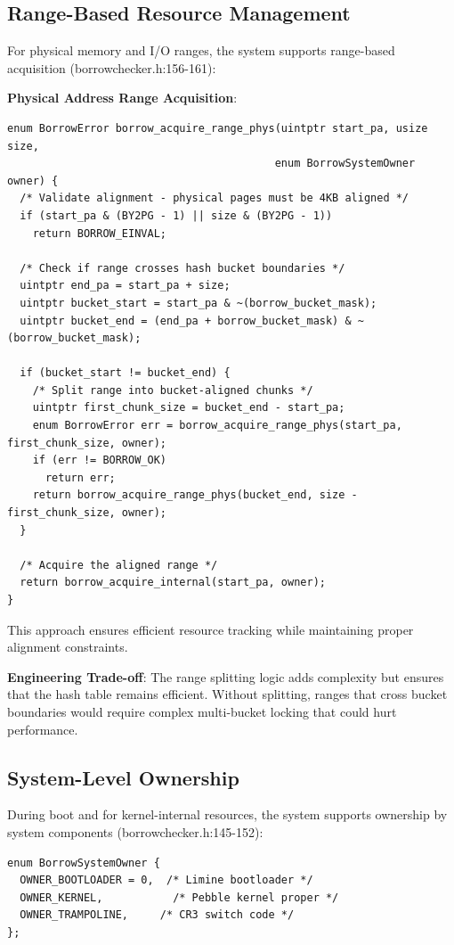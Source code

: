 \documentclass[11pt,letterpaper]{article}
\begin{document}
\subsection{Range-Based Resource Management}

For physical memory and I/O ranges, the system supports range-based acquisition (borrowchecker.h:156-161):

\textbf{Physical Address Range Acquisition}:

\begin{lstlisting}
enum BorrowError borrow_acquire_range_phys(uintptr start_pa, usize size,
                                          enum BorrowSystemOwner owner) {
  /* Validate alignment - physical pages must be 4KB aligned */
  if (start_pa & (BY2PG - 1) || size & (BY2PG - 1))
    return BORROW_EINVAL;
  
  /* Check if range crosses hash bucket boundaries */
  uintptr end_pa = start_pa + size;
  uintptr bucket_start = start_pa & ~(borrow_bucket_mask);
  uintptr bucket_end = (end_pa + borrow_bucket_mask) & ~(borrow_bucket_mask);
  
  if (bucket_start != bucket_end) {
    /* Split range into bucket-aligned chunks */
    uintptr first_chunk_size = bucket_end - start_pa;
    enum BorrowError err = borrow_acquire_range_phys(start_pa, first_chunk_size, owner);
    if (err != BORROW_OK)
      return err;
    return borrow_acquire_range_phys(bucket_end, size - first_chunk_size, owner);
  }
  
  /* Acquire the aligned range */
  return borrow_acquire_internal(start_pa, owner);
}
\end{lstlisting}

This approach ensures efficient resource tracking while maintaining proper alignment constraints.

\textbf{Engineering Trade-off}: The range splitting logic adds complexity but ensures that the hash table remains efficient. Without splitting, ranges that cross bucket boundaries would require complex multi-bucket locking that could hurt performance.

\subsection{System-Level Ownership}

During boot and for kernel-internal resources, the system supports ownership by system components (borrowchecker.h:145-152):

\begin{lstlisting}
enum BorrowSystemOwner {
  OWNER_BOOTLOADER = 0,  /* Limine bootloader */
  OWNER_KERNEL,           /* Pebble kernel proper */
  OWNER_TRAMPOLINE,     /* CR3 switch code */
};
\end{lstlisting}
\end{document}
